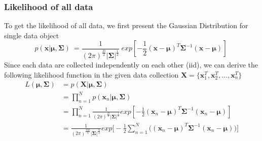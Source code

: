 \documentclass[11pt,a4paper]{article}
\newcommand{\htab}{\hspace*{0.63cm}}
\newcommand{\bs}[1]{\boldsymbol{#1}}
\newcommand{\bmu}{\boldsymbol{\mu}}
\newcommand{\bsum}{\boldsymbol{\Sigma}}
\newcommand{\xv}{\textbf{x}}
\newcommand{\xnv}{\boldsymbol{x}_{n} }
\begin{document}
\subsubsection{Likelihood of all data}
\htab To get the likelihood of all data, we first present the Gaussian Distribution for single data object
    \begin{equation} 
        p(\xv|\bmu, \bsum) \ 
        = \frac{1}{(2\pi)^{\frac{D}{2}} |\bsum|^{\frac{1}{2} }}  \
            exp[-\frac{1}{2} (\xv-\bmu)^{T} \bsum^{-1} (\xv-\bmu)] \ 
    \end{equation}
    \htab Since each data are collected independently on each other (iid), we can derive the following likelihood function in the given data collection 
    $\boldsymbol{X} = \{ \boldsymbol{x}_{1}^{T},\boldsymbol{x}_{2}^{T}, ...,\boldsymbol{x}_{n}^{T} \} $
    \begin{equation} \label{mtg:likelihood}
        \begin{aligned}
            L(\bmu,\bsum) & = p(\bs{X}|\bmu,\bsum)\\
    & = \prod_{n=1}^{N} p(\xnv|\bmu, \bsum) \\
    & = \prod_{n=1}^{N} \frac{1}{(2\pi)^{\frac{D}{2}} |\bsum|^{\frac{1}{2} }}  
            exp[-\frac{1}{2} (\xnv-\bmu)^{T} \bsum^{-1} (\xnv-\bmu)]  \\
    & =  \frac{1}{(2\pi)^{\frac{ND}{2}} |\bsum|^{\frac{N}{2} } } 
        exp\Big[-\frac{1}{2} \sum_{n=1}^{N} \Big( (\xnv-\bmu)^{T} \bsum^{-1} (\xnv-\bmu) \Big) \Big]
    \end{aligned}
    \end{equation} 
\end{document}
